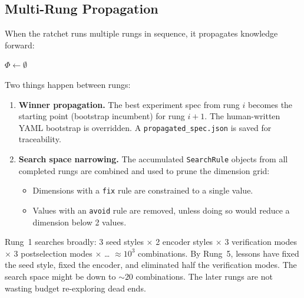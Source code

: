 \documentclass[11pt,a4paper]{article}
\newcommand{\code}[1]{\texttt{#1}}
\newcommand{\file}[1]{\texttt{\small #1}}
\begin{document}
\subsection{Multi-Rung Propagation}
\label{sec:propagation}

When the ratchet runs multiple rungs in sequence, it propagates knowledge
forward:

\begin{algorithm}[H]
\SetAlgoLined
{}
$\Phi \leftarrow \emptyset$ 
\caption{Run-Ratchet: progressive multi-rung search}
\label{alg:ratchet}
\end{algorithm}

Two things happen between rungs:

\begin{enumerate}
  \item \textbf{Winner propagation.} The best experiment spec from rung $i$
    becomes the starting point (bootstrap incumbent) for rung $i{+}1$. The
    human-written YAML bootstrap is overridden. A \file{propagated\_spec.json}
    is saved for traceability.

  \item \textbf{Search space narrowing.} The accumulated \code{SearchRule}
    objects from all completed rungs are combined and used to prune the
    dimension grid:
    \begin{itemize}
      \item Dimensions with a \code{fix} rule are constrained to a single
        value.
      \item Values with an \code{avoid} rule are removed, unless doing so
        would reduce a dimension below 2 values.
    \end{itemize}
\end{enumerate}

\begin{intuition}
Rung~1 searches broadly: 3 seed styles $\times$ 2 encoder styles $\times$ 3
verification modes $\times$ 3 postselection modes $\times$ \ldots{} $\approx
10^3$ combinations. By Rung~5, lessons have fixed the seed style, fixed the
encoder, and eliminated half the verification modes. The search space might be
down to ${\sim}20$ combinations. The later rungs are not wasting budget
re-exploring dead ends.
\end{intuition}
\end{document}
